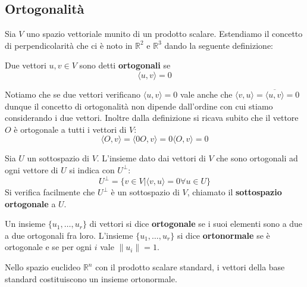 
\subsection{Ortogonalit\`a}
Sia $V$ uno spazio vettoriale munito di un prodotto scalare. Estendiamo il
concetto di perpendicolarit\`a che ci \`e noto in $\mathbb{R}^2$ e
$\mathbb{R}^3$ dando la seguente definizione:

\begin{defn}
	Due vettori $u, v \in V$ sono detti \textbf{ortogonali} se
	\begin{equation*}
		\langle u, v \rangle = 0
	\end{equation*}
\end{defn}

Notiamo che se due vettori verificano $\langle u, v \rangle = 0$ vale anche che
$\langle v, u \rangle = \overline{\langle u, v \rangle} = 0$ dunque il concetto
di ortogonalit\`a non dipende dall'ordine con cui stiamo considerando i due
vettori. Inoltre dalla definizione si ricava subito che il vettore $O$ \`e
ortogonale a tutti i vettori di $V$:
\begin{equation*}
	\langle O, v \rangle = \langle 0O, v \rangle = 0\langle O, v \rangle = 0
\end{equation*}

\begin{defn}
	Sia $U$ un sottospazio di $V$. L'insieme dato dai vettori di $V$ che sono
	ortogonali ad ogni vettore di $U$ si indica con $U^{\perp}$:
	\begin{equation*}
		U^{\perp} = \{v \in V | \langle v, u \rangle = 0 \forall u \in U\}
	\end{equation*}
	Si verifica facilmente che $U^{\perp}$ \`e un sottospazio di $V$, chiamato
	il \textbf{sottospazio ortogonale} a $U$.
\end{defn}

\begin{defn}
	Un insieme $\{u_1, \dots, u_r\}$ di vettori si dice \textbf{ortogonale} se
	i suoi elementi sono a due a due ortogonali fra loro. L'insieme
	$\{u_1, \dots, u_r\}$ si dice \textbf{ortonormale} se \`e ortogonale e se
	per ogni $i$ vale $\| u_i \| = 1$.
\end{defn}

\begin{example}
	Nello spazio euclideo $\mathbb{R}^n$ con il prodotto scalare standard,
	i vettori della base standard costituiscono un insieme ortonormale.
\end{example}

